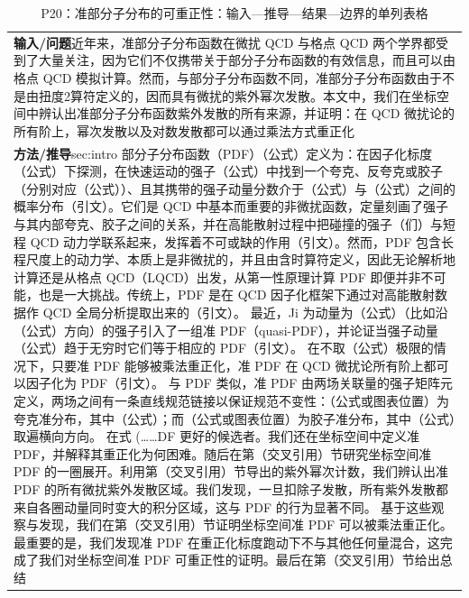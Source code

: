 \documentclass[UTF8,11pt,oneside]{ctexbook}
\begin{document}
\begin{table}[htbp]
  \centering
  \caption*{P20：准部分子分布的可重正性：输入—推导—结果—边界的单列表格}
  \small
  \begin{tabular}{@{}p{}@{}}
    \toprule
    \textbf{输入/问题}\quad 近年来，准部分子分布函数在微扰 QCD 与格点 QCD 两个学界都受到了大量关注，因为它们不仅携带关于部分子分布函数的有效信息，而且可以由格点 QCD 模拟计算。然而，与部分子分布函数不同，准部分子分布函数由于不是由扭度2算符定义的，因而具有微扰的紫外幂次发散。本文中，我们在坐标空间中辨认出准部分子分布函数紫外发散的所有来源，并证明：在 QCD 微扰论的所有阶上，幂次发散以及对数发散都可以通过乘法方式重正化 \\
    \textbf{方法/推导}\quad sec:intro 部分子分布函数（PDF）（公式）定义为：在因子化标度（公式）下探测，在快速运动的强子（公式）中找到一个夸克、反夸克或胶子（分别对应（公式））、且其携带的强子动量分数介于（公式）与（公式）之间的概率分布（引文）。它们是 QCD 中基本而重要的非微扰函数，定量刻画了强子与其内部夸克、胶子之间的关系，并在高能散射过程中把碰撞的强子（们）与短程 QCD 动力学联系起来，发挥着不可或缺的作用（引文）。然而，PDF 包含长程尺度上的动力学、本质上是非微扰的，并且由含时算符定义，因此无论解析地计算还是从格点 QCD（LQCD）出发，从第一性原理计算 PDF 即便并非不可能，也是一大挑战。传统上，PDF 是在 QCD 因子化框架下通过对高能散射数据作 QCD 全局分析提取出来的（引文）。 最近，Ji 为动量为（公式）（比如沿（公式）方向）的强子引入了一组准 PDF（quasi-PDF），并论证当强子动量（公式）趋于无穷时它们等于相应的 PDF（引文）。 在不取（公式）极限的情况下，只要准 PDF 能够被乘法重正化，准 PDF 在 QCD 微扰论所有阶上都可以因子化为 PDF（引文）。 与 PDF 类似，准 PDF 由两场关联量的强子矩阵元定义，两场之间有一条直线规范链接以保证规范不变性：（公式或图表位置）为夸克准分布，其中（公式）；而（公式或图表位置）为胶子准分布，其中（公式）取遍横向方向。 在式 (……DF 更好的候选者。我们还在坐标空间中定义准 PDF，并解释其重正化为何困难。随后在第（交叉引用）节研究坐标空间准 PDF 的一圈展开。利用第（交叉引用）节导出的紫外幂次计数，我们辨认出准 PDF 的所有微扰紫外发散区域。我们发现，一旦扣除子发散，所有紫外发散都来自各圈动量同时变大的积分区域，这与 PDF 的行为显著不同。 基于这些观察与发现，我们在第（交叉引用）节证明坐标空间准 PDF 可以被乘法重正化。最重要的是，我们发现准 PDF 在重正化标度跑动下不与其他任何量混合，这完成了我们对坐标空间准 PDF 可重正性的证明。最后在第（交叉引用）节给出总结 \\

\end{tabular}
\end{table}
\end{document}
